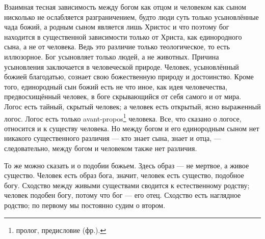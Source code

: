 \documentclass[12pt,oneside]{book}
\begin{document}
Взаимная тесная зависимость между богом как отцом и человеком как сыном нисколько не ослабляется разграничением, будто люди суть только усыновлённые чада божий, а родным сыном является лишь Христос и что поэтому бог находится в существенной зависимости только от Христа, как единородного сына, а не от человека. Ведь это различие только теологическое, то есть иллюзорное. Бог усыновляет только людей, а не животных. Причина усыновления заключается в человеческой природе. Человек, усыновлённый божией благодатью, сознает свою божественную природу и достоинство. Кроме того, единородный сын божий есть не что иное, как идея человечества, предвосхищённый человек, в боге скрывающийся от себя самого и от мира. Логос есть тайный, скрытый человек; а человек есть открытый, ясно выраженный логос. Логос есть только avant-propos\footnote{пролог, предисловие (фр.).} человека. Все, что сказано о логосе, относится и к существу человека\ddag\let\svthefootnote\thefootnote\let\thefootnote\relax{}\let\thefootnote\svthefootnote. Но между богом и его единородным сыном нет никакого существенного различия --- кто знает сына, знает и отца, --- следовательно, между богом и человеком также нет различия.



То же можно сказать и о подобии божьем. Здесь образ --- не мертвое, а живое существо. Человек есть образ бога, значит, человек есть существо, подобное богу. Сходство между живыми существами сводится к естественному родству; человек подобен богу, потому что бог --- его отец. Сходство есть наглядное родство; по первому мы постоянно судим о втором.
\end{document}
